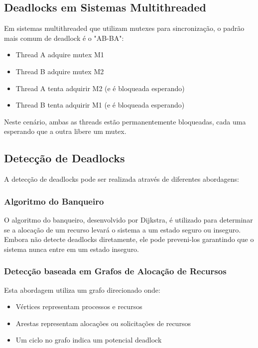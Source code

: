 \subsection{Deadlocks em Sistemas Multithreaded}

Em sistemas multithreaded que utilizam mutexes para sincronização, o padrão mais comum de deadlock é o "AB-BA":

\begin{itemize}
    \item Thread A adquire mutex M1
    \item Thread B adquire mutex M2
    \item Thread A tenta adquirir M2 (e é bloqueada esperando)
    \item Thread B tenta adquirir M1 (e é bloqueada esperando)
\end{itemize}

Neste cenário, ambas as threads estão permanentemente bloqueadas, cada uma esperando que a outra libere um mutex.

\subsection{Detecção de Deadlocks}

A detecção de deadlocks pode ser realizada através de diferentes abordagens:

\subsubsection{Algoritmo do Banqueiro}

O algoritmo do banqueiro, desenvolvido por Dijkstra, é utilizado para determinar se a alocação de um recurso levará o sistema a um estado seguro ou inseguro. Embora não detecte deadlocks diretamente, ele pode preveni-los garantindo que o sistema nunca entre em um estado inseguro.

\subsubsection{Detecção baseada em Grafos de Alocação de Recursos}

Esta abordagem utiliza um grafo direcionado onde:
\begin{itemize}
    \item Vértices representam processos e recursos
    \item Arestas representam alocações ou solicitações de recursos
    \item Um ciclo no grafo indica um potencial deadlock
\end{itemize}

